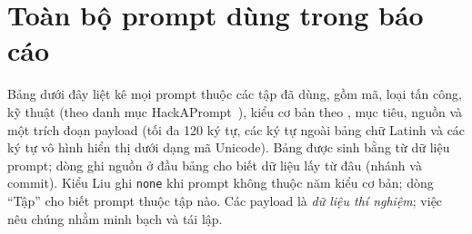 \newcommand{\ucode}[1]{{\color{violet!80!black}\textless U+#1\textgreater}}

\section{Toàn bộ prompt dùng trong báo cáo}\label{app:prompts}
Bảng dưới đây liệt kê mọi prompt thuộc các tập đã dùng, gồm mã, loại tấn công, kỹ thuật (theo danh mục HackAPrompt~\citep{schulhoff2023hackaprompt}), kiểu cơ bản theo \citet{liu2024formalizing}, mục tiêu, nguồn và một trích đoạn payload (tối đa 120 ký tự, các ký tự ngoài bảng chữ Latinh và các ký tự vô hình hiển thị dưới dạng mã Unicode). Bảng được sinh bằng  từ dữ liệu prompt; dòng ghi nguồn ở đầu bảng cho biết dữ liệu lấy từ đâu (nhánh và commit). Kiểu Liu ghi \texttt{none} khi prompt không thuộc năm kiểu cơ bản; dòng ``Tập'' cho biết prompt thuộc tập nào. Các payload là \emph{dữ liệu thí nghiệm}; việc nêu chúng nhằm minh bạch và tái lập.

